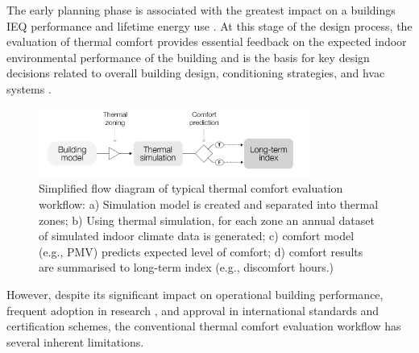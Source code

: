 The early planning phase is associated with the greatest impact on a buildings IEQ performance and lifetime energy use \citep{Raji2017}. At this stage of the design process, the evaluation of thermal comfort provides essential feedback on the expected indoor environmental performance of the building and is the basis for key design decisions related to overall building design, conditioning strategies, and \gls{hvac} systems \citep{Yang2014, Attia2015}.


\begin{figure}[h!]
    \centering
    \includegraphics[width=8.9cm]{manuscript/src/figures/conventional-workflow.png}
    \caption{Simplified flow diagram of typical thermal comfort evaluation workflow: a) Simulation model is created and separated into thermal zones; b) Using thermal simulation, for each zone an annual dataset of simulated indoor climate data is generated; c) comfort model (e.g., PMV) predicts expected level of comfort; d) comfort results are summarised to long-term index (e.g., discomfort hours.) }
    \label{fig:typical-workflow}
\end{figure}


However, despite its significant impact on operational building performance, frequent adoption in research \citep{Roetzel2012,Jafarpur2021,Silva2016, Attia2015}, and approval in international standards and certification schemes, the conventional thermal comfort evaluation workflow has several inherent limitations.


